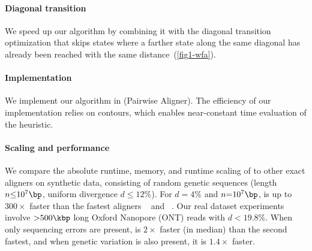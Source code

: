 \paragraph{Diagonal transition \A}
We speed up our algorithm by combining it with the diagonal transition
optimization that skips states where a farther state along the same diagonal
has already been reached with the same distance~(\cref{fig1-wfa}).

\paragraph{Implementation}
We implement our algorithm in \astarpa (\A Pairwise Aligner). The efficiency of
our implementation relies on contours, which enables near-constant time
evaluation of the heuristic.

\paragraph{Scaling and performance}
We compare the absolute runtime, memory, and runtime scaling of \astarpa to
other exact aligners on synthetic data, consisting of random genetic sequences
(length $n{\leq}10^7\bp$, uniform divergence $d{\leq}12\%$). For $d{=}4\%$ and
$n{=}10^7\bp$, \astarpa is up to $300\times$ faster than the fastest aligners
\edlib~\citep{vsovsic2017edlib} and \wfa~\citep{marco2022optimal}. Our real
dataset experiments involve ${>}500\kbp$ long Oxford Nanopore (ONT) reads with
$d{<}19.8\%$. When only sequencing errors are present, \astarpa is $2\times$
faster (in median) than the second fastest, and when genetic variation is also
present, it is $1.4\times$ faster.
